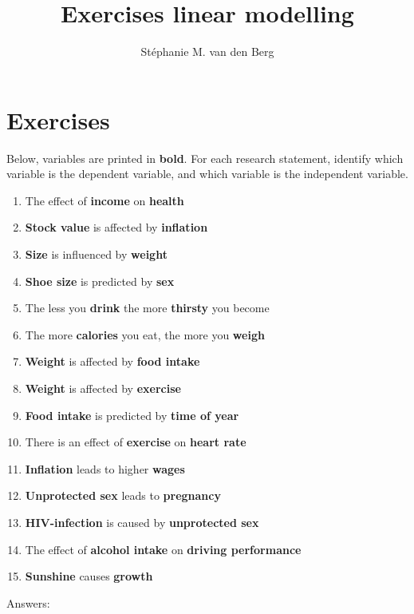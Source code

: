 \documentclass{article}\usepackage[]{graphicx}\usepackage[]{color}
\title{Exercises linear modelling}
\author{St\'ephanie M. van den Berg}
\begin{document}
\maketitle





\section{Exercises}

Below, variables are printed in \textbf{bold}. For each research statement, identify which variable is the dependent variable, and which variable is the independent variable.

\begin{enumerate}

\item The effect of \textbf{income} on \textbf{health}
\item \textbf{Stock value} is affected by \textbf{inflation}
\item \textbf{Size} is influenced by \textbf{weight}
\item \textbf{Shoe size} is predicted by \textbf{sex}
\item The less you \textbf{drink} the more \textbf{thirsty} you become
\item The more \textbf{calories} you eat, the more you \textbf{weigh}
\item \textbf{Weight} is affected by \textbf{food intake}
\item \textbf{Weight} is affected by \textbf{exercise}
\item \textbf{Food intake} is predicted by \textbf{time of year}
\item There is an effect of \textbf{exercise} on \textbf{heart rate}
\item \textbf{Inflation} leads to higher \textbf{wages}
\item \textbf{Unprotected sex} leads to \textbf{pregnancy}
\item \textbf{HIV-infection} is caused by \textbf{unprotected sex}
\item The effect of \textbf{alcohol intake} on \textbf{driving performance}
\item \textbf{Sunshine} causes \textbf{growth}


\end{enumerate}

Answers:
\end{document}
